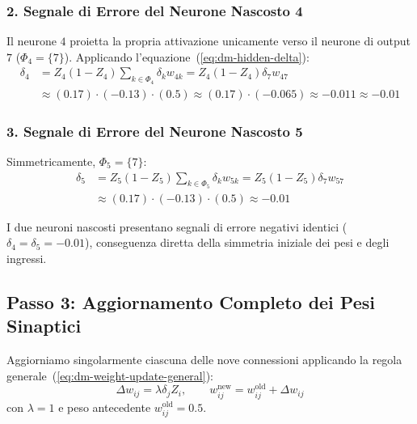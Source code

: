 \subsubsection{2. Segnale di Errore del Neurone Nascosto 4}
Il neurone $4$ proietta la propria attivazione unicamente verso il neurone di output $7$ ($\Phi_4 = \{7\}$). Applicando l'equazione~(\ref{eq:dm-hidden-delta}):
\begin{align}
    \delta_4 &= Z_4 (1 - Z_4) \sum_{k \in \Phi_4} \delta_k w_{4k} = Z_4 (1 - Z_4) \delta_7 w_{47} \nonumber \\
             &\approx (0.17) \cdot (-0.13) \cdot (0.5) \approx (0.17) \cdot (-0.065) \approx -0.011 \approx \mathbf{-0.01}
\end{align}

\subsubsection{3. Segnale di Errore del Neurone Nascosto 5}
Simmetricamente, $\Phi_5 = \{7\}$:
\begin{align}
    \delta_5 &= Z_5 (1 - Z_5) \sum_{k \in \Phi_5} \delta_k w_{5k} = Z_5 (1 - Z_5) \delta_7 w_{57} \nonumber \\
             &\approx (0.17) \cdot (-0.13) \cdot (0.5) \approx \mathbf{-0.01}
\end{align}

I due neuroni nascosti presentano segnali di errore negativi identici ($\delta_4 = \delta_5 = -0.01$), conseguenza diretta della simmetria iniziale dei pesi e degli ingressi.

\FloatBarrier
\subsection{Passo 3: Aggiornamento Completo dei Pesi Sinaptici}
\label{subsec:dm-step3-weights-update}

Aggiorniamo singolarmente ciascuna delle nove connessioni applicando la regola generale~(\ref{eq:dm-weight-update-general}):
\begin{equation}
    \Delta w_{ij} = \lambda \delta_j Z_i, \qquad w_{ij}^{\text{new}} = w_{ij}^{\text{old}} + \Delta w_{ij}
\end{equation}
con $\lambda = 1$ e peso antecedente $w_{ij}^{\text{old}} = 0.5$.

